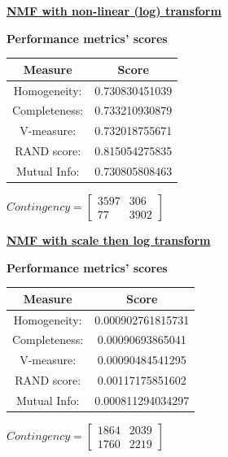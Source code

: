 \documentclass{article}
\begin{document}
\underline{\textbf{NMF with non-linear (log) transform}} 

\begin{center}
	\textbf{Performance metrics' scores} \\ \vspace{10pt}
	\begin{tabular}{*{2}{c}}
		\toprule
		\textbf{Measure} & \textbf{Score} \\
		\midrule
		Homogeneity: 		& 0.730830451039 \\
		\midrule
		Completeness: 		& 0.733210930879 \\
		\midrule
		V-measure: 			& 0.732018755671 \\
		\midrule
		RAND score: 		& 0.815054275835 \\
		\midrule
		Mutual Info: 		& 0.730805808463 \\
		\bottomrule
	\end{tabular}
	\qquad
	$Contingency = \left[\begin{array}{*{2}{c}}
			3597  & 306 \\
			77 	& 3902 
				\end{array}\right]
			$
\end{center}

\newpage


\underline{\textbf{NMF with scale then log transform}} 

\begin{center}
	\textbf{Performance metrics' scores} \\ \vspace{10pt}
	\begin{tabular}{*{2}{c}}
		\toprule
		\textbf{Measure} & \textbf{Score} \\
		\midrule
		Homogeneity: & 0.000902761815731 \\
		\midrule
		Completeness: & 0.00090693865041 \\
		\midrule
		V-measure: 	& 0.00090484541295  \\
		\midrule
		RAND score: & 0.00117175851602  \\
		\midrule
		Mutual Info: & 0.000811294034297  \\
		\bottomrule
	\end{tabular}
	\qquad
	$Contingency = \left[\begin{array}{*{2}{c}}
			1864 & 2039\\
			1760 & 2219 
				\end{array}\right]
			$
\end{center}
\end{document}
